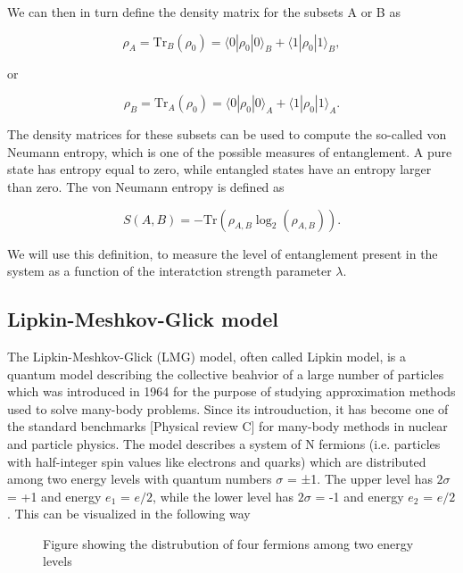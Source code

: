 \documentclass[onecolumn,10pt,cleanfoot]{asme2ej}
\begin{document}
We can then in turn define the density matrix for the subsets A or B as

\begin{equation}
\rho_A = \text{Tr}_B(\rho_0) = \langle0|\rho_0|0\rangle_B + \langle1|\rho_0|1\rangle_B,
\end{equation}

or

\begin{equation}
\rho_B = \text{Tr}_A(\rho_0) = \langle0|\rho_0|0\rangle_A + \langle1|\rho_0|1\rangle_A.
\end{equation}

The density matrices for these subsets can be used to compute the so-called von Neumann entropy, which is one of the possible measures of entanglement. A pure state has entropy equal to zero, while entangled states have an entropy larger than zero. The von Neumann entropy is defined as

\begin{equation}
S(A, B) = -\text{Tr}(\rho_{A,B} \log_2(\rho_{A,B})).
\end{equation}

We will use this definition, to measure the level of entanglement present in the system as a function of the interatction strength parameter $\lambda$.


\subsection{Lipkin-Meshkov-Glick model}
The Lipkin-Meshkov-Glick (LMG) model, often called Lipkin model, is a quantum model describing the collective beahvior of a large number of particles which was introduced in 1964 for the purpose of studying approximation methods used to solve many-body problems. Since its introuduction, it has become one of the standard benchmarks [Physical review C] for many-body methods in nuclear and particle physics. The model describes a system of N fermions (i.e. particles with half-integer spin values like electrons and quarks) which are distributed among two energy levels with quantum numbers $\sigma$ = ±1. The upper level has $2\sigma$ = +1 and energy $e_{1}$ = $e/2$, while the lower level has $2\sigma$ = -1 and energy $e_{2}$ = $e/2$. This can be visualized in the following way

\begin{figure}[H]
	\centering
	\caption{Figure showing the distrubution of four fermions among two energy levels}
\end{figure}
\end{document}
